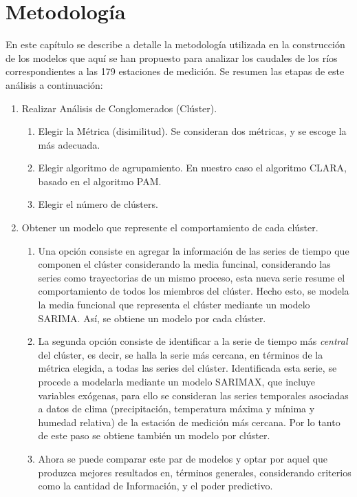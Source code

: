 \documentclass[12pt,oneside]{book}\usepackage[]{graphicx}\usepackage[]{color}
\theoremstyle{definition} %
\begin{document}

\chapter{Metodología} \label{cap2}


En este capítulo se describe a detalle la metodología utilizada en la construcción de los modelos que aquí se han propuesto para analizar los caudales de los ríos correspondientes a las 179 estaciones de medición. Se resumen las etapas de este análisis a continuación:

\begin{enumerate}

\item Realizar Análisis de Conglomerados (Clúster).
\begin{enumerate}
\item Elegir la Métrica (disimilitud). Se consideran dos métricas, y se escoge la más adecuada.
\item Elegir algoritmo de agrupamiento. En nuestro caso el algoritmo CLARA, basado en el algoritmo PAM.
\item Elegir el número de clústers.
\end{enumerate}

\item Obtener un modelo que represente el comportamiento de cada clúster.

\begin{enumerate}
\item Una opción consiste en agregar la información de las series de tiempo que componen el clúster considerando la media funcinal, considerando las series como trayectorias de un mismo proceso, esta nueva serie resume el comportamiento de todos los miembros del clúster. Hecho esto, se modela la media funcional que representa el clúster mediante un modelo SARIMA. Así, se obtiene un modelo por cada clúster.
\item La segunda opción consiste de identificar a la serie de tiempo más \textit{central} del clúster, es decir, se halla la serie más cercana, en términos de la métrica elegida, a todas las series del clúster. Identificada esta serie, se procede a modelarla mediante un modelo SARIMAX, que incluye variables exógenas, para ello se consideran las series temporales asociadas a datos de clima (precipitación, temperatura máxima y mínima y humedad relativa) de la estación de medición más cercana. Por lo tanto de este paso se obtiene también un modelo por clúster.
\item Ahora se puede comparar este par de modelos y optar por aquel que produzca mejores resultados en, términos generales, considerando criterios como la cantidad de Información, y el poder predictivo.


\end{enumerate}
\end{enumerate}
\end{document}
